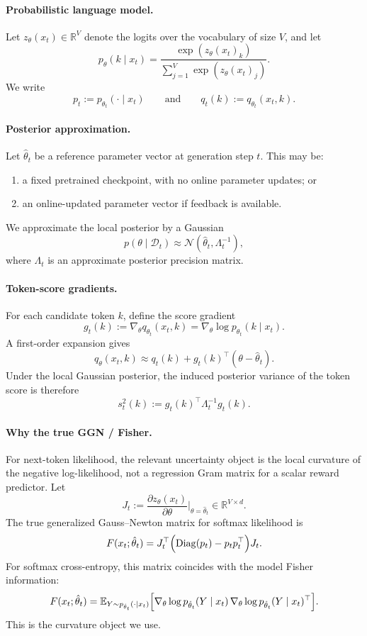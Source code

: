 \documentclass[11pt]{article}
\begin{document}
\paragraph{Probabilistic language model.}
Let $z_\theta(x_t) \in \mathbb{R}^{V}$ denote the logits over the
vocabulary of size $V$, and let
\[
p_\theta(k \mid x_t)
=
\frac{\exp(z_\theta(x_t)_k)}
{\sum_{j=1}^{V}\exp(z_\theta(x_t)_j)}.
\]
We write
\[
p_t := p_{\theta_t}(\cdot \mid x_t)
\qquad\text{and}\qquad
q_t(k) := q_{\theta_t}(x_t,k).
\]

\paragraph{Posterior approximation.}
Let $\hat\theta_t$ be a reference parameter vector at generation step $t$.
This may be:
\begin{enumerate}[leftmargin=1.5em]
\item a fixed pretrained checkpoint, with no online parameter updates; or
\item an online-updated parameter vector if feedback is available.
\end{enumerate}
We approximate the local posterior by a Gaussian
\[
p(\theta \mid \mathcal{D}_t)
\approx
\mathcal{N}(\hat\theta_t,\Lambda_t^{-1}),
\]
where $\Lambda_t$ is an approximate posterior precision matrix.

\paragraph{Token-score gradients.}
For each candidate token $k$, define the score gradient
\[
g_t(k) := \nabla_\theta q_{\theta_t}(x_t,k)
=
\nabla_\theta \log p_{\theta_t}(k \mid x_t).
\]
A first-order expansion gives
\[
q_\theta(x_t,k)
\approx
q_t(k) + g_t(k)^\top(\theta-\hat\theta_t).
\]
Under the local Gaussian posterior, the induced posterior variance of
the token score is therefore
\[
s_t^2(k)
:=
g_t(k)^\top \Lambda_t^{-1} g_t(k).
\]

\paragraph{Why the true GGN / Fisher.}
For next-token likelihood, the relevant uncertainty object is the local
curvature of the negative log-likelihood, not a regression Gram matrix
for a scalar reward predictor.
Let
\[
J_t := \frac{\partial z_\theta(x_t)}{\partial \theta}\bigg|_{\theta=\hat\theta_t}
\in \mathbb{R}^{V \times d}.
\]
The true generalized Gauss--Newton matrix for softmax likelihood is
\[
F(x_t;\hat\theta_t)
=
J_t^\top
\Bigl(
\mathrm{Diag}(p_t)-p_t p_t^\top
\Bigr)
J_t.
\]
For softmax cross-entropy, this matrix coincides with the model Fisher
information:
\[
F(x_t;\hat\theta_t)
=
\mathbb{E}_{Y\sim p_{\hat\theta_t}(\cdot\mid x_t)}
\Bigl[
\nabla_\theta \log p_{\hat\theta_t}(Y\mid x_t)\,
\nabla_\theta \log p_{\hat\theta_t}(Y\mid x_t)^\top
\Bigr].
\]
This is the curvature object we use.
\end{document}
